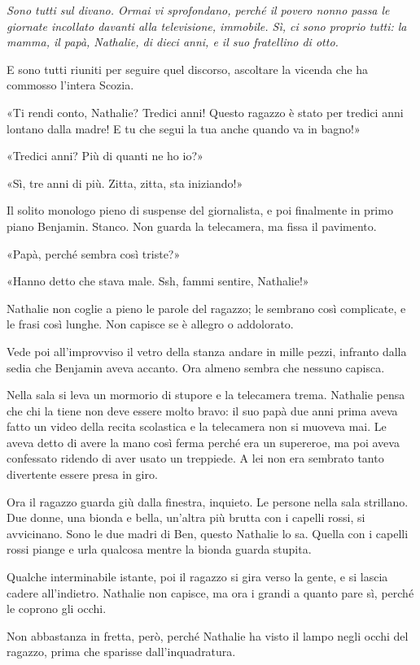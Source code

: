 \documentclass[a4paper,11pt,oneside,openright,final]{memoir}
\begin{document}
{\itshape
Sono tutti sul divano. Ormai vi sprofondano, perché il povero nonno passa le
giornate incollato davanti alla televisione, immobile. Sì, ci sono proprio
tutti: la mamma, il papà, Nathalie, di dieci anni, e il suo fratellino di otto.

E sono tutti riuniti per seguire quel discorso, ascoltare la vicenda che ha
commosso l’intera Scozia.

«Ti rendi conto, Nathalie? Tredici anni! Questo ragazzo è stato per tredici
anni lontano dalla madre! E tu che segui la tua anche quando va in bagno!»

«Tredici anni? Più di quanti ne ho io?»

«Sì, tre anni di più. Zitta, zitta, sta iniziando!»

Il solito monologo pieno di suspense del giornalista, e poi finalmente in primo
piano Benjamin. Stanco. Non guarda la telecamera, ma fissa il pavimento.

«Papà, perché sembra così triste?»

«Hanno detto che stava male. Ssh, fammi sentire, Nathalie!»

Nathalie non coglie a pieno le parole del ragazzo; le sembrano così complicate,
e le frasi così lunghe. Non capisce se è allegro o addolorato.

Vede poi all’improvviso il vetro della stanza andare in mille pezzi, infranto
dalla sedia che Benjamin aveva accanto. Ora almeno sembra che nessuno capisca.

Nella sala si leva un mormorio di stupore e la telecamera trema. Nathalie pensa
che chi la tiene non deve essere molto bravo: il suo papà due anni prima aveva
fatto un video della recita scolastica e la telecamera non si muoveva mai. Le
aveva detto di avere la mano così ferma perché era un supereroe, ma poi aveva
confessato ridendo di aver usato un treppiede. A lei non era sembrato tanto
divertente essere presa in giro.

Ora il ragazzo guarda giù dalla finestra, inquieto. Le persone nella sala
strillano. Due donne, una bionda e bella, un’altra più brutta con i capelli
rossi, si avvicinano. Sono le due madri di Ben, questo Nathalie lo sa. Quella
con i capelli rossi piange e urla qualcosa mentre la bionda guarda stupita.

Qualche interminabile istante, poi il ragazzo si gira verso la gente, e si
lascia cadere all’indietro. Nathalie non capisce, ma ora i grandi a quanto
pare sì, perché le coprono gli occhi.

Non abbastanza in fretta, però, perché Nathalie ha visto il lampo negli occhi
del ragazzo, prima che sparisse dall’inquadratura.
\/}

\clearpage

\tableofcontents
\end{document}
